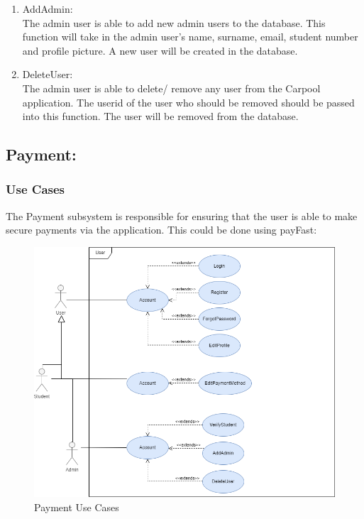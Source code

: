 \documentclass[hidelinks, 12pt, a4paper]{article}
\begin{document}
\begin{enumerate}[label=U1.\arabic*]
      \item AddAdmin:\\
            The admin user is able to add new admin users to the database. This function will take in the admin user’s name, surname, email, student number and profile picture. A new user will be created in the database.

      \item DeleteUser: \\
            The admin user is able to delete/ remove any user from the Carpool application. The userid of the user who should be removed should be passed into this function. The user will be removed from the database.

\end{enumerate}

\newpage
\subsection{Payment:}
\subsubsection{Use Cases}
The Payment subsystem is responsible for ensuring that the user is able to make secure payments via the application. This could be done using payFast:

\begin{figure}[H]

      \centering
      \includegraphics[width=15cm]{images/User Usecase.drawio.png}
      \caption{Payment Use Cases}
      \label{fig:User UseCases}

\end{figure}
\end{document}
